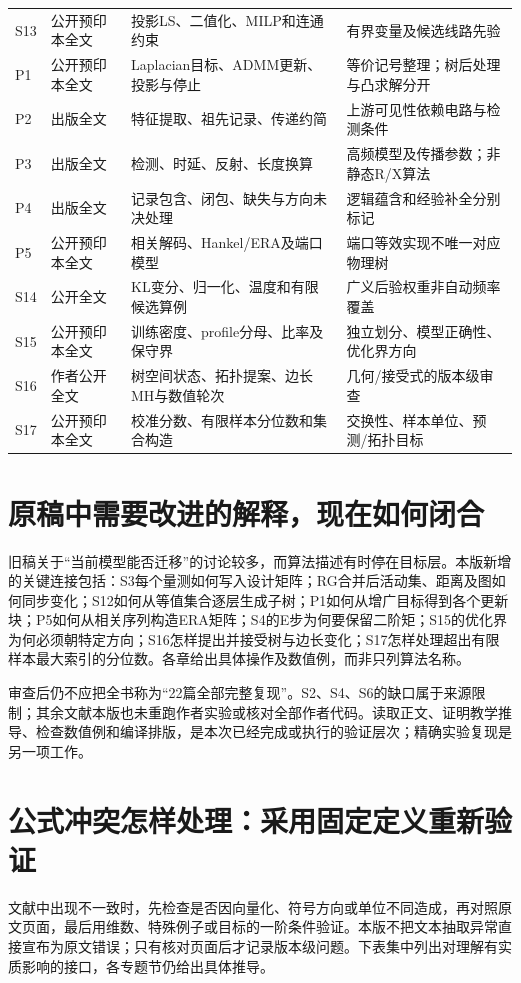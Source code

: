 \documentclass[UTF8,11pt,fontset=fandol,openany,oneside]{ctexbook}
\theoremstyle{definition}
\theoremstyle{remark}
\numberwithin{equation}{chapter}
\begin{document}
\begin{longtable}{p{}p{}p{}p{}}
S13 & 公开预印本全文 & 投影LS、二值化、MILP和连通约束 & 有界变量及候选线路先验\\
P1 & 公开预印本全文 & Laplacian目标、ADMM更新、投影与停止 & 等价记号整理；树后处理与凸求解分开\\
P2 & 出版全文 & 特征提取、祖先记录、传递约简 & 上游可见性依赖电路与检测条件\\
P3 & 出版全文 & 检测、时延、反射、长度换算 & 高频模型及传播参数；非静态R/X算法\\
P4 & 出版全文 & 记录包含、闭包、缺失与方向未决处理 & 逻辑蕴含和经验补全分别标记\\
P5 & 公开预印本全文 & 相关解码、Hankel/ERA及端口模型 & 端口等效实现不唯一对应物理树\\
S14 & 公开全文 & KL变分、归一化、温度和有限候选算例 & 广义后验权重非自动频率覆盖\\
S15 & 公开预印本全文 & 训练密度、profile分母、比率及保守界 & 独立划分、模型正确性、优化界方向\\
S16 & 作者公开全文 & 树空间状态、拓扑提案、边长MH与数值轮次 & 几何/接受式的版本级审查\\
S17 & 公开预印本全文 & 校准分数、有限样本分位数和集合构造 & 交换性、样本单位、预测/拓扑目标\\
\bottomrule
\end{longtable}

\section{原稿中需要改进的解释，现在如何闭合}
旧稿关于“当前模型能否迁移”的讨论较多，而算法描述有时停在目标层。本版新增的关键连接包括：S3每个量测如何写入设计矩阵；RG合并后活动集、距离及图如何同步变化；S12如何从等值集合逐层生成子树；P1如何从增广目标得到各个更新块；P5如何从相关序列构造ERA矩阵；S4的E步为何要保留二阶矩；S15的优化界为何必须朝特定方向；S16怎样提出并接受树与边长变化；S17怎样处理超出有限样本最大索引的分位数。各章给出具体操作及数值例，而非只列算法名称。

审查后仍不应把全书称为“22篇全部完整复现”。S2、S4、S6的缺口属于来源限制；其余文献本版也未重跑作者实验或核对全部作者代码。读取正文、证明教学推导、检查数值例和编译排版，是本次已经完成或执行的验证层次；精确实验复现是另一项工作。

\section{公式冲突怎样处理：采用固定定义重新验证}
文献中出现不一致时，先检查是否因向量化、符号方向或单位不同造成，再对照原文页面，最后用维数、特殊例子或目标的一阶条件验证。本版不把文本抽取异常直接宣布为原文错误；只有核对页面后才记录版本级问题。下表集中列出对理解有实质影响的接口，各专题节仍给出具体推导。
\end{document}
